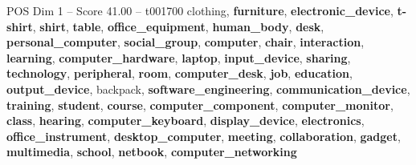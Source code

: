 \begin{textsample}{POS Dim 1 – Score 41.00 – t001700}  \label{ex:f1_pos_002}
clothing, \textbf{furniture}, \textbf{electronic\_device}, \textbf{t-shirt}, \textbf{shirt}, \textbf{table}, \textbf{office\_equipment}, \textbf{human\_body}, \textbf{desk}, \textbf{personal\_computer}, \textbf{social\_group}, \textbf{computer}, \textbf{chair}, \textbf{interaction}, \textbf{learning}, \textbf{computer\_hardware}, \textbf{laptop}, \textbf{input\_device}, \textbf{sharing}, \textbf{technology}, \textbf{peripheral}, \textbf{room}, \textbf{computer\_desk}, \textbf{job}, \textbf{education}, \textbf{output\_device}, backpack, \textbf{software\_engineering}, \textbf{communication\_device}, \textbf{training}, \textbf{student}, \textbf{course}, \textbf{computer\_component}, \textbf{computer\_monitor}, \textbf{class}, \textbf{hearing}, \textbf{computer\_keyboard}, \textbf{display\_device}, \textbf{electronics}, \textbf{office\_instrument}, \textbf{desktop\_computer}, \textbf{meeting}, \textbf{collaboration}, \textbf{gadget}, \textbf{multimedia}, \textbf{school}, \textbf{netbook}, \textbf{computer\_networking}

\end{textsample}
